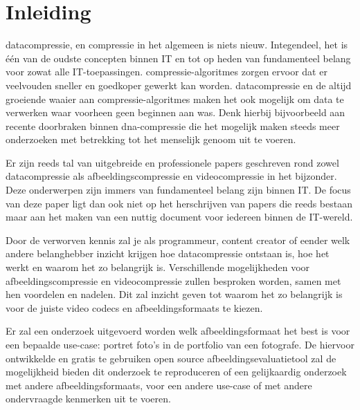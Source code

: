 
\chapter{Inleiding}
\label{ch:inleiding}

\Gls{datacompressie}, en compressie in het algemeen is niets nieuw. Integendeel, het is één van de oudste concepten binnen IT en tot op heden van fundamenteel belang voor zowat alle IT-toepassingen. \Glspl{compressie-algoritme} zorgen ervoor dat er veelvouden sneller en goedkoper gewerkt kan worden. \gls{datacompressie} en de altijd groeiende waaier aan \glspl{compressie-algoritme} maken het ook mogelijk om data te verwerken waar voorheen geen beginnen aan was. Denk hierbij bijvoorbeeld aan recente doorbraken binnen \gls{dna-compressie} die het mogelijk maken steeds meer onderzoeken met betrekking tot het menselijk genoom uit te voeren.

Er zijn reeds tal van uitgebreide en professionele papers geschreven rond zowel \gls{datacompressie} als \gls{afbeeldingscompressie} en \gls{videocompressie} in het bijzonder. Deze onderwerpen zijn immers van fundamenteel belang zijn binnen IT. De focus van deze paper ligt dan ook niet op het herschrijven van papers die reeds bestaan maar aan het maken van een nuttig document voor iedereen binnen de IT-wereld. 

Door de verworven kennis zal je als programmeur, content creator of eender welk andere belanghebber inzicht krijgen hoe \gls{datacompressie} ontstaan is, hoe het werkt en waarom het zo belangrijk is. Verschillende mogelijkheden voor \gls{afbeeldingscompressie} en \gls{videocompressie} zullen besproken worden, samen met hen voordelen en nadelen. Dit zal inzicht geven tot waarom het zo belangrijk is voor de juiste video \glspl{codec} en \glspl{afbeeldingsformaat} te kiezen.

Er zal een onderzoek uitgevoerd worden welk \gls{afbeeldingsformaat} het best is voor een bepaalde \gls{use-case}: portret foto's in de portfolio van een fotografe. De hiervoor ontwikkelde en gratis te gebruiken open source  \gls{afbeeldingsevaluatietool} zal de mogelijkheid bieden dit onderzoek te reproduceren of een gelijkaardig onderzoek met andere \glspl{afbeeldingsformaat}, voor een andere \gls{use-case} of met andere ondervraagde kenmerken uit te voeren.

